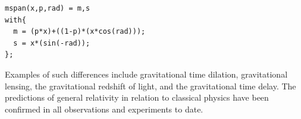 \begin{lstlisting}
mspan(x,p,rad) = m,s
with{
  m = (p*x)+((1-p)*(x*cos(rad)));
  s = x*(sin(-rad));
};
\end{lstlisting}

Examples of such differences include gravitational time dilation, gravitational
lensing, the gravitational redshift of light, and the gravitational time delay.
The predictions of general relativity in relation to classical physics have been
confirmed in all observations and experiments to date. 

\vfill\null

\raggedright





